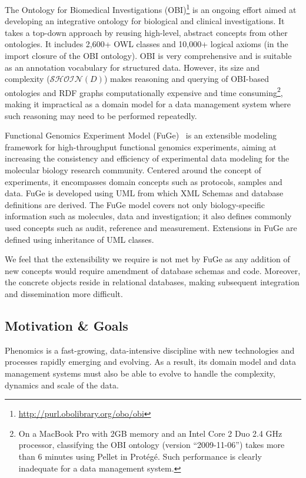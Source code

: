 \documentclass{llncs}
\begin{document}
The Ontology for Biomedical Investigations
(OBI)\footnote{\url{http://purl.obolibrary.org/obo/obi}} is an ongoing
effort aimed at developing an integrative ontology for biological and
clinical investigations. It takes a top-down approach by reusing
high-level, abstract concepts from other ontologies. It includes 2,600+
OWL classes and 10,000+ logical axioms (in the import closure of the OBI
ontology). OBI is very comprehensive and is suitable as an annotation
vocabulary for structured data. However, its size and complexity 
($\mathcal{SHOIN}(D)$) makes reasoning and querying of OBI-based 
ontologies and RDF graphs computationally expensive and time 
consuming\footnote{On a MacBook Pro with 2GB memory and an Intel 
Core 2 Duo 2.4 GHz processor, classifying the OBI ontology (version 
``2009-11-06'') takes more than 6 minutes using Pellet in Prot\'eg\'e. 
Such performance is clearly inadequate for a data management system.}, 
making it impractical as a domain model for a data management system 
where such reasoning may need to be performed repeatedly.

Functional Genomics Experiment Model (FuGe)~\cite{citeulike:1756058} is
an extensible modeling framework for high-throughput functional
genomics experiments, aiming at increasing the consistency and
efficiency of experimental data modeling for the molecular biology
research community. Centered around the concept of experiments, it
encompasses domain concepts such as protocols, samples and data. FuGe
is developed using UML from which XML Schemas and database definitions
are derived. The FuGe model covers not only biology-specific
information such as molecules, data and investigation; it also defines
commonly used concepts such as audit, reference and measurement.
Extensions in FuGe are defined using inheritance of UML classes.

We feel that the extensibility we require is not met by FuGe as any
addition of new concepts would require amendment of database schemas
and code. Moreover, the concrete objects reside in relational
databases, making subsequent integration and dissemination more
difficult.

\subsection{Motivation \& Goals}
Phenomics is a fast-growing, data-intensive discipline with new
technologies and processes rapidly emerging and evolving. As a result,
its domain model and data management systems must also be able to
evolve to handle the complexity, dynamics and scale of the data.
\end{document}
